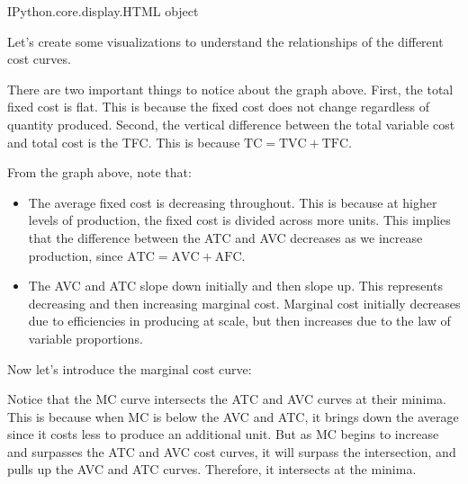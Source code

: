 \documentclass[letterpaper,10pt,english]{jupyterBook}
\begin{document}
\begin{sphinxVerbatim}[commandchars=\\\{\}]
\PYGZlt{}IPython.core.display.HTML object\PYGZgt{}
\end{sphinxVerbatim}

\sphinxAtStartPar
Let’s create some visualizations to understand the relationships of the different cost curves.

\noindent{}

\sphinxAtStartPar
There are two important things to notice about the graph above. First, the total fixed cost is flat. This is because the fixed cost does not change regardless of quantity produced. Second, the vertical difference between the total variable cost and total cost is the TFC. This is because \(\text{TC} = \text{TVC} + \text{TFC}\).

\noindent{}

\sphinxAtStartPar
From the graph above, note that:
\begin{itemize}
\item {} 
\sphinxAtStartPar
The average fixed cost is decreasing throughout. This is because at higher levels of production, the fixed cost is divided across more units. This implies that the difference between the ATC and AVC decreases as we increase production, since \(\text{ATC} = \text{AVC} + \text{AFC}\).

\item {} 
\sphinxAtStartPar
The AVC and ATC slope down initially and then slope up. This represents decreasing and then increasing marginal cost. Marginal cost initially decreases due to efficiencies in producing at scale, but then increases due to the law of variable proportions.

\end{itemize}

\sphinxAtStartPar
Now let’s introduce the marginal cost curve:

\noindent{}

\sphinxAtStartPar
Notice that the MC curve intersects the ATC and AVC curves at their minima. This is because when MC is below the AVC and ATC, it brings down the average since it costs less to produce an additional unit. But as MC begins to increase and surpasses the ATC and AVC cost curves, it will surpass the intersection, and pulls up the AVC and ATC curves. Therefore, it intersects at the minima.
\end{document}

